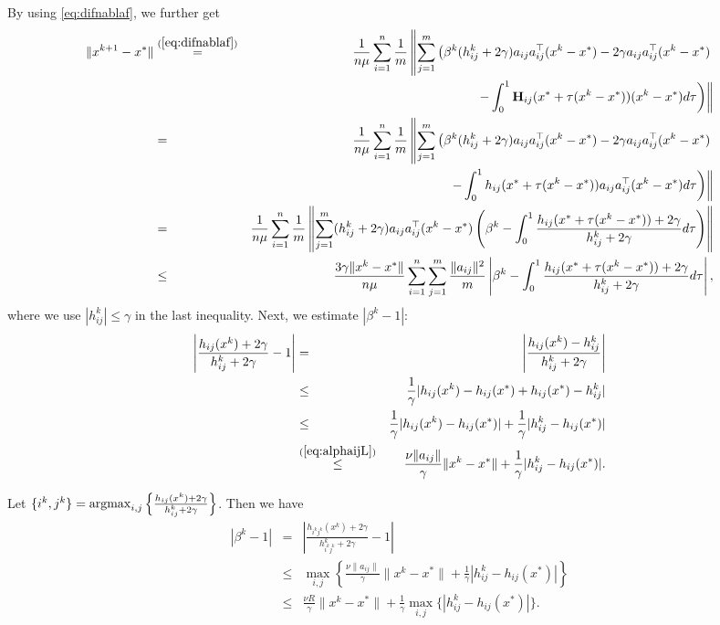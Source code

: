 \documentclass[10pt]{article}
\newcommand{\newalpha}{h}
\newcommand{\mH}{\mathbf{H}}
\begin{document}
By using 	\eqref{eq:difnablaf}, we further get
\begin{eqnarray*}
	\|x^{k+1} - x^*\|
	&\overset{(\ref{eq:difnablaf})}{=}& \frac{1}{n \mu} \sum_{i=1}^n \frac{1}{m} \left\|  \sum_{j=1}^{m} \left( \beta^k (h_{ij}^k + 2\gamma)a_{ij}a_{ij}^\top (x^k - x^*) - 2\gamma a_{ij}a_{ij}^\top (x^k - x^*) \right. \right. \\ 
	&& \left. \left. -  \int_{0}^1 \mH_{ij} (x^* + \tau(x^k - x^*)) (x^k - x^*)d\tau  \right)   \right\| \\ 
	&=& \frac{1}{n \mu} \sum_{i=1}^n \frac{1}{m} \left\|  \sum_{j=1}^{m} \left( \beta^k (h_{ij}^k + 2\gamma)a_{ij}a_{ij}^\top (x^k - x^*) - 2\gamma a_{ij}a_{ij}^\top (x^k - x^*) \right. \right. \\ 
	&& \left. \left. -  \int_{0}^1 \newalpha_{ij} (x^* + \tau(x^k - x^*))a_{ij}a_{ij}^\top (x^k - x^*)d\tau  \right)   \right\| \\ 
	&=& \frac{1}{n \mu} \sum_{i=1}^n \frac{1}{m} \left\|  \sum_{j=1}^{m}  (h_{ij}^k + 2\gamma)a_{ij}a_{ij}^\top (x^k - x^*) \left( \beta^k - \int_{0}^1 \frac{\newalpha_{ij}(x^* + \tau(x^k - x^*)) + 2\gamma}{ h_{ij}^k + 2\gamma} d\tau \right) \right\| \\ 
	&\leq& \frac{3\gamma\|x^k - x^*\|}{n \mu} \sum_{i=1}^n \sum_{j=1}^{m} \frac{\|a_{ij}\|^2}{m} \left|   \beta^k - \int_{0}^1 \frac{\newalpha_{ij}(x^* + \tau(x^k - x^*)) + 2\gamma}{ h_{ij}^k + 2\gamma} d\tau   \right|, 
\end{eqnarray*}
where we use $|h_{ij}^k| \leq \gamma$ in the last inequality. Next, we estimate $|\beta^k - 1|$:
\begin{eqnarray*}
	\left|  \frac{\newalpha_{ij}(x^k) + 2\gamma}{h_{ij}^k + 2\gamma}  - 1  \right| &=& \left|  \frac{\newalpha_{ij}(x^k) - h_{ij}^k}{h_{ij}^k + 2\gamma}  \right| \\ 
	&\leq& \frac{1}{\gamma} |\newalpha_{ij}(x^k) - \newalpha_{ij}(x^*) + \newalpha_{ij}(x^*) - h_{ij}^k| \\ 
	&\leq& \frac{1}{\gamma} |\newalpha_{ij}(x^k) - \newalpha_{ij}(x^*)| + \frac{1}{\gamma} |h_{ij}^k - \newalpha_{ij}(x^*)| \\ 
	&\overset{(\ref{eq:alphaijL})}{\leq}& \frac{\nu \|a_{ij}\|}{\gamma} \|x^k - x^*\| + \frac{1}{\gamma} |h_{ij}^k - \newalpha_{ij}(x^*)|. 
\end{eqnarray*}



Let $\{i^k, j^k\} = {\rm argmax}_{i, j} \left\{ \frac{\newalpha_{ij}(x^k) + 2\gamma}{h_{ij}^k + 2\gamma}  \right\}$. Then we have 
\begin{eqnarray*}
	|\beta^k - 1| &=& \left| \frac{\newalpha_{i^kj^k}(x^k) + 2\gamma}{h_{i^kj^k}^k + 2\gamma}   - 1  \right| \\ 
	&\leq& \max_{i, j} \left\{  \frac{\nu \|a_{ij}\|}{\gamma} \|x^k - x^*\| + \frac{1}{\gamma} |h_{ij}^k - \newalpha_{ij}(x^*)|  \right\} \\ 
	&\leq& \frac{\nu R}{\gamma} \|x^k - x^*\| + \frac{1}{\gamma} \max_{i, j} \{|h_{ij}^k - \newalpha_{ij}(x^*)| \}.  
\end{eqnarray*}
\end{document}
